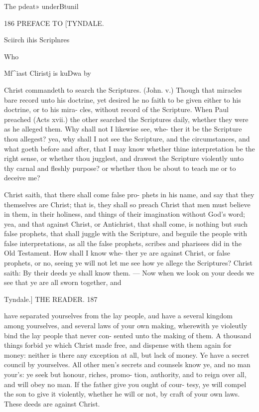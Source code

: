 \documentclass{custom}
\begin{document}
The pdeat» 
underBtunil 


186
PREFACE TO 
[TYNDALE.

Sciirch ihis 
Scriplnres 

Who 

Mf^iast 
Cliristj is 
kuDwa by 

Christ commandeth to search the Scriptures.
(John. v.) Though that miracles bare record 
unto his doctrine, yet desired he no faith to be 
given either to his doctrine, or to his mira- 
cles, without record of the Scripture. When 
Paul preached (Acts xvii.) the other searched 
the Scriptures daily, whether they were as he 
alleged them. Why shall not I likewise see, whe-
ther it be the Scripture thou allegest? yea, why 
shall I not see the Scripture, and the circumstances, 
and what goeth before and after, that I may 
know whether thine interpretation be the right 
sense, or whether thou jugglest, and drawest the 
Scripture violently unto thy carnal and fleshly 
purpose? or whether thou be about to teach me 
or to deceive me? 

Christ saith, that there shall come false pro- 
phets in his name, and say that they themselves 
are Christ; that is, they shall so preach Christ 
that men must believe in them, in their holiness,
and things of their imagination without God's word; 
yea, and that against Christ, or Antichrist, that 
shall come, is nothing but such false prophets,
that shall juggle with the Scripture, and 
beguile the people with false interpretations, as 
all the false prophets, scribes and pharisees did 
in the Old Testament. How shall I know whe- 
ther ye are against Christ, or false prophets, or 
no, seeing ye will not let me see how ye allege 
the Scriptures? Christ saith: By their deeds 
ye shall know them. — Now when we look on your 
deeds we see that ye are all sworn together, and 


Tyndale.] 
THE READER. 
187

have separated yourselves from the lay people, 
aud have a several kingdom among yourselves, 
and several laws of your own making, wherewith 
ye violeutly bind the lay people that never con- 
sented unto the making of them. A thousand 
things forbid ye which Christ made free, and 
dispense with them again for money: neither is 
there any exception at all, but lack of money. 
Ye have a secret council by yourselves. All 
other men's secrets and counsels know ye, and no 
man your's: ye seek but honour, riches, promo- 
tion, authority, and to reign over all, and will obey 
no man. If the father give you ought of cour- 
tesy, ye will compel the son to give it violently, 
whether he will or not, by craft of your own 
laws. These deeds are against Christ.
\end{document}
